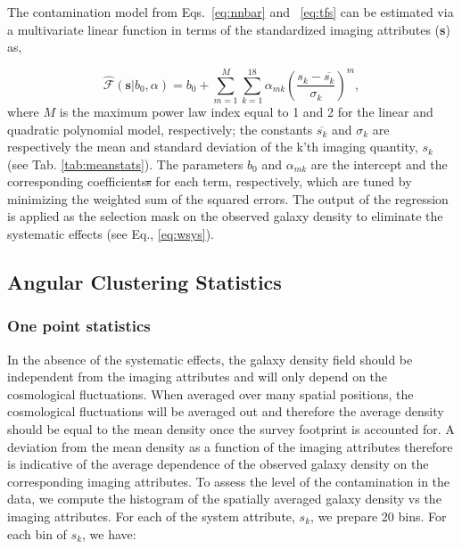 \documentclass[fleqn, usenatbib]{mnras}
\begin{document}
The contamination model from Eqs.~\ref{eq:nnbar} and ~\ref{eq:tfs} can be estimated via a multivariate linear function in terms of the standardized imaging attributes (\textbf{s}) as,

\begin{equation}\label{eq:multvar}
\hat{\mathcal{F}}(\textbf{s}|b_{0},\alpha) = b_{0} + \sum_{m=1}^{M}\sum_{k=1}^{18} \alpha_{mk} (\frac{s_{k}-\overline{s_{k}}}{\sigma_{k}})^{m} ,
\end{equation}
where $M$ is the maximum power law index equal to 1 and 2 for the linear and quadratic polynomial model, respectively; the constants $\overline{s_{k}}$ and $\sigma_{k}$ are respectively the mean and standard deviation of the k'th imaging quantity, $s_{k}$ (see Tab. \ref{tab:meanstats}). The parameters $b_{0}$ and $\alpha_{mk}$ are the intercept and the corresponding coefficients\sout{s} for each term, respectively, which are tuned by minimizing the weighted sum of the squared errors. The output of the regression is applied as the selection mask on the observed galaxy density to eliminate the systematic effects (see Eq., \ref{eq:wsys}).\\

\subsection{Angular Clustering Statistics}\label{subsec:ang_clustering}
\subsubsection{One point statistics}
In the absence of the systematic effects, the galaxy density field should be independent from the imaging attributes and will only depend on the cosmological fluctuations. When averaged over many spatial positions, the cosmological fluctuations will be averaged out and therefore the average density should be equal to the mean density once the survey footprint is accounted for. A deviation from the mean density as a function of the imaging attributes therefore is indicative of the average dependence of the observed galaxy density on the corresponding imaging attributes. To assess the level of the contamination in the data, we compute the histogram of the spatially averaged galaxy density vs the imaging attributes. For each of the system attribute, $s_k$, we prepare 20 bins. For each bin of $s_{k}$, we have:
\end{document}
